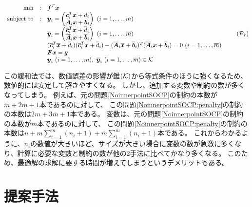 \documentclass[11pt,a4paper,dvipdfmx,titlepage,uplatex]{jsarticle}
\theoremstyle{mystyle}
\newcommand{\0}{\mathbf{0}}
\def\b{\mbox{\boldmath $b$}}
\def\c{\mbox{\boldmath $c$}}
\def\f{\mbox{\boldmath $f$}}
\def\g{\mbox{\boldmath $g$}}
\def\x{\mbox{\boldmath $x$}}
\def\y{\mbox{\boldmath $y$}}
\def\A{\mbox{\boldmath $A$}}
\def\F{\mbox{\boldmath $F$}}
\def\KC{\mbox{$\cal K$}}
\def\PC{\mbox{$\cal P$}}
\begin{document}
\begin{align}
  \begin{array}{rcl}
    \min & : & \f^T \x \\
    \text{subject to} & : & \y_i = \begin{pmatrix}
    \c_i^T \x + d_i \\  \A_i \x + \b_i
  \end{pmatrix}
  \ (i=1, \ldots, m) \\
  & & \overline{\y}_i = \begin{pmatrix}
  \overline{\c}_i^T \x + \overline{d}_i \\  \overline{\A}_i \x + \overline{\b}_i
\end{pmatrix}
\ (i=1, \ldots, \overline{m}) \\
& & (\overline{\c}_i^T \overline{\x} + \overline{d}_i)(\overline{\c}_i^T \x + \overline{d}_i)
-
(\overline{\A}_i \overline{\x} + \overline{\b}_i)^T(\overline{\A}_i \x + \overline{\b}_i) = 0 \ (i=1, \ldots, \overline{m}) \\
& & \F \x = \g \\
& & \y_i \ (i=1, \ldots, m), \ \overline{\y}_i \ (i=1, \ldots, \overline{m}) \in \KC
\end{array}
\tag{$\PC_r$}
\label{NoinnerpointSOCP:relax}
\end{align}

この緩和法では、数値誤差の影響が錐$(\KC)$から等式条件のほうに強くなるため、
数値的には安定して解きやすくなる。
しかし、追加する変数や制約の数が多くなってしまう。
例えば、元の問題\eqref{NoinnerpointSOCP}の制約の本数が$m + 2 \overline{m} + 1$本であるのに対して、
この問題\eqref{NoinnerpointSOCP:penalty}の制約の本数は$2 m + 3 \overline{m} + 1$本である。
変数は、元の問題\eqref{NoinnerpointSOCP}の制約の本数が$m$本であるのに対して、
この問題\eqref{NoinnerpointSOCP:penalty}の制約の本数は$n + m\sum_{i=1}^m(n_i + 1) + \overline{m} \sum_{i=1}^{\overline{m}} (n_i + 1)$本である。
これからわかるように、$n_i$の数値が大きいほど、サイズが大きい場合に変数の数が急激に多くなり、計算に必要な変数と制約の数が他の2手法に比べてかなり多くなる。
このため、最適解の求解に要する時間が増えてしまうというデメリットもある。

\clearpage

\section{提案手法}\label{sec:SimulatedAnnealing}
\end{document}
